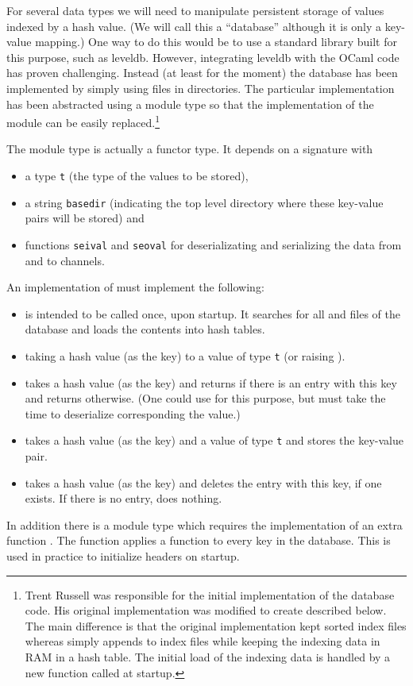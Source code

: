 For several data types we will need to manipulate persistent storage of values 
indexed by a hash value. (We will call this a ``database'' although 
it is only a key-value mapping.)
One way to do this would be to use a standard library built for this purpose,
such as leveldb.
However, integrating leveldb with the OCaml code has proven challenging.
Instead (at least for the moment) the database has been implemented
by simply using files in directories.
The particular implementation has been abstracted using a module type
so that the implementation of the module can be easily replaced.\footnote{Trent Russell was responsible for the initial implementation of the database code. His original implementation {} was modified to create {} described below. The main difference is that the original {} implementation kept sorted index files whereas {} simply appends to index files while keeping the indexing data in RAM in a hash table. The initial load of the indexing data is handled by a new function {} called at startup.}

The module type {} is actually a functor type.
It depends on a signature with
\begin{itemize}
\item a type {\tt{t}} (the type of the values to be stored),
\item a string {\tt{basedir}} (indicating the top level directory where these key-value pairs will be stored) and
\item functions {\tt{seival}} and {\tt{seoval}} for deserializating and serializing the data from and to channels.
\end{itemize}
An implementation of {} must implement the following:
\begin{itemize}
\item {} is intended to be called once, upon startup. It searches for all  and  files of the database and loads the contents into hash tables.
\item {} taking a hash value (as the key) to a value of type {\tt{t}} (or raising {}).
\item {} takes a hash value (as the key) and returns {} if there is an entry with this key and returns {} otherwise. (One could use {} for this purpose, but {} must take the time to deserialize corresponding the value.)
\item {} takes a hash value (as the key) and a value of type {\tt{t}} and stores the key-value pair.
\item {} takes a hash value (as the key) and deletes the entry with this key, if one exists. If there is no entry, {} does nothing.
\end{itemize}
In addition there is a module type {} which requires the implementation of an extra function {}.
The function {} applies a function to every key in the database.
This is used in practice to initialize headers on startup.

